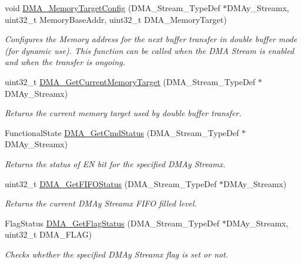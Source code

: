 \begin{DoxyCompactItemize}
void \hyperlink{group___d_m_a_ga4ebcffd32eb6968ac61cfb64a6bae258}{D\-M\-A\-\_\-\-Memory\-Target\-Config} (D\-M\-A\-\_\-\-Stream\-\_\-\-Type\-Def $\ast$D\-M\-Ay\-\_\-\-Streamx, uint32\-\_\-t Memory\-Base\-Addr, uint32\-\_\-t D\-M\-A\-\_\-\-Memory\-Target)
\begin{DoxyCompactList}\small\item\em Configures the Memory address for the next buffer transfer in double buffer mode (for dynamic use). This function can be called when the D\-M\-A Stream is enabled and when the transfer is ongoing. \end{DoxyCompactList}\item 
uint32\-\_\-t \hyperlink{group___d_m_a_ga74b6624f9faa2f43c9369ddbdeab241c}{D\-M\-A\-\_\-\-Get\-Current\-Memory\-Target} (D\-M\-A\-\_\-\-Stream\-\_\-\-Type\-Def $\ast$D\-M\-Ay\-\_\-\-Streamx)
\begin{DoxyCompactList}\small\item\em Returns the current memory target used by double buffer transfer. \end{DoxyCompactList}\item 
Functional\-State \hyperlink{group___d_m_a_gaa4d631cdd6cd020106435f30c0c6fb15}{D\-M\-A\-\_\-\-Get\-Cmd\-Status} (D\-M\-A\-\_\-\-Stream\-\_\-\-Type\-Def $\ast$D\-M\-Ay\-\_\-\-Streamx)
\begin{DoxyCompactList}\small\item\em Returns the status of E\-N bit for the specified D\-M\-Ay Streamx. \end{DoxyCompactList}\item 
uint32\-\_\-t \hyperlink{group___d_m_a_ga9893809a7067861ec111f7d712ebf28d}{D\-M\-A\-\_\-\-Get\-F\-I\-F\-O\-Status} (D\-M\-A\-\_\-\-Stream\-\_\-\-Type\-Def $\ast$D\-M\-Ay\-\_\-\-Streamx)
\begin{DoxyCompactList}\small\item\em Returns the current D\-M\-Ay Streamx F\-I\-F\-O filled level. \end{DoxyCompactList}\item 
Flag\-Status \hyperlink{group___d_m_a_ga10cfc0fe31d64a1fd8fb3efb4ae2a411}{D\-M\-A\-\_\-\-Get\-Flag\-Status} (D\-M\-A\-\_\-\-Stream\-\_\-\-Type\-Def $\ast$D\-M\-Ay\-\_\-\-Streamx, uint32\-\_\-t D\-M\-A\-\_\-\-F\-L\-A\-G)
\begin{DoxyCompactList}\small\item\em Checks whether the specified D\-M\-Ay Streamx flag is set or not. \end{DoxyCompactList}\item 

\end{DoxyCompactItemize}
